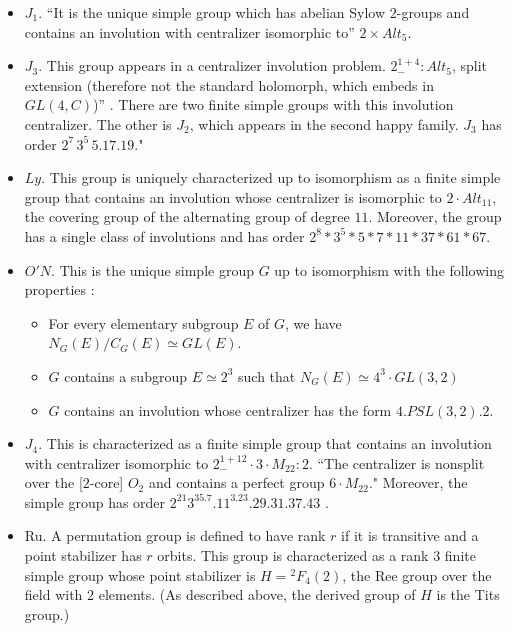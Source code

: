 \begin{itemize}
\item $J_1$.  ``It is the unique simple group which has abelian Sylow
  $2$-groups and contains an involution with centralizer isomorphic to''
  $2 \times Alt_5$.   \cite[p.150]{robert1998twelve}
\item $J_3$. This group appears in a centralizer involution problem.
  $2^{1+4}_{-}:Alt_5$, split extension (therefore not the standard
  holomorph, which embeds in $GL(4,C)$)''
  \cite[p.151]{robert1998twelve}.  There are two finite simple groups
  with this involution centralizer.  The other is $J_2$, which appears
  in the second happy family.  $J_3$ has order $2^7\,3^5\,5.17.19$."
\item $Ly$.  This group is uniquely characterized up to isomorphism as
  a finite simple group that contains an involution whose centralizer
  is isomorphic to $2 \cdot Alt_{11}$, the covering group of the
  alternating group of degree $11$.  Moreover, the group has a single
  class of involutions and has order
  $2^8*3^5*5*7*11*37*61*67$. \cite[p.151]{robert1998twelve}
\item $O'N$. This is the unique simple group $G$ up to isomorphism
  with the following properties \cite[p.152]{robert1998twelve}:
\begin{itemize}
\item For every elementary subgroup $E$ of $G$, we have
 $N_G(E)/C_G(E) \simeq GL(E)$.
 \item $G$ contains a subgroup $E \simeq 2^3$
 such that $N_G(E) \simeq 4^3 \cdot 
 GL(3,2)$
 \item $G$ contains an involution whose centralizer has the form
 $4.PSL(3,2).2$.
\end{itemize}
\item $J_4$. This is characterized as a finite simple group that
  contains an involution with centralizer isomorphic to
  $2^{1+12}_{-}\cdot 3\cdot M_{22}:2$.  ``The centralizer is nonsplit
  over the [$2$-core] $O_2$ and contains a perfect group $6\cdot
  M_{22}$."  Moreover, the simple group has order
  $2^{21}3^35.7.11^3.23.29.31.37.43$ \cite[p.152]{robert1998twelve}.
\item Ru.  A permutation group is defined to have rank $r$ if it is
  transitive and a point stabilizer has $r$ orbits.  This group is
  characterized as a rank $3$ finite simple group whose point
  stabilizer is $H = {}^2F_4(2)$, the Ree group over the field with
  $2$ elements. (As described above, the derived group of $H$ is the
  Tits group.) \cite[p.151]{robert1998twelve}
\end{itemize}
 

